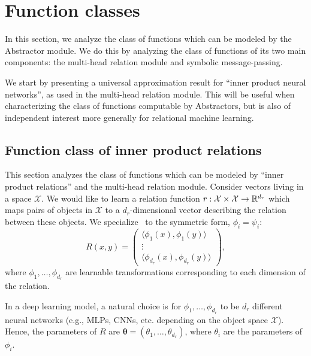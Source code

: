 \def\rdot{\bigcdot}
\def\F{{\mathfrak{F}}}
\def\MLP{\text{MLP}}

\section{Function classes}\label{sec:function_spaces}

In this section, we analyze the class of functions which can be modeled by the Abstractor module. We do this by analyzing the class of functions of its two main components: the multi-head relation module and symbolic message-passing.

We start by presenting a universal approximation result for ``inner product neural networks'', as used in the multi-head relation module. This will be useful when characterizing the class of functions computable by Abstractors, but is also of independent interest more generally for relational machine learning.

\subsection{Function class of inner product relations}

This section analyzes the class of functions which can be modeled by ``inner product relations'' and the multi-head relation module. Consider vectors living in a space \(\mathcal{X}\). We would like to learn a relation function \(r: \mathcal{X} \times \mathcal{X} \to \mathbb{R}^{d_r}\) which maps pairs of objects in \(\mathcal{X}\) to a \(d_r\)-dimensional vector describing the relation between these objects. We specialize~ to the symmetric form, $\phi_i = \psi_i$:
\begin{equation}
	\label{eq:symmetric_inner_product_relations}
	R(x, y) = \begin{pmatrix}\langle \phi_{1}(x), \phi_{1}(y) \rangle \\ \vdots \\ \langle \phi_{d_r}(x), \phi_{d_r}(y) \rangle \end{pmatrix},
\end{equation}
where \(\phi_{1}, \ldots, \phi_{d_r}\) are learnable transformations corresponding to each dimension of the relation.

In a deep learning model, a natural choice is for \(\phi_{1}, \ldots, \phi_{d_r}\) to be \(d_r\) different neural networks (e.g., MLPs, CNNs, etc. depending on the object space \(\mathcal{X}\)). Hence, the parameters of \(R\) are \(\boldsymbol{\theta} = (\theta_{1}, \ldots, \theta_{d_r})\), where \(\theta_{i}\) are the parameters of \(\phi_{i}\).

